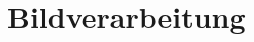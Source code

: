 \section{Bildverarbeitung} %
\label{sec:bildverarbeitung}
\begin{comment}
	Bildverarbeitung: Notwendige Verfahren und Konzepte erläutern.
\end{comment}

\begin{comment}
	YUV und RGB bzw. RGBA
	kCVPixelFormatType_420YpCbCr8BiPlanarVideoRange, kCVPixelFormatType_420YpCbCr8BiPlanarFullRange and kCVPixelFormatType_32BGRA, except on iPhone 3G, where the supported pixel formats are kCVPixelFormatType_422YpCbCr8 and kCVPixelFormatType_32BGRA..(AVCaptureVideoDataOutput Class Reference)

	\subsection{Grundlagen} %
	\label{sec:grundlagen}
	Ein digitales Bild ist definiert durch seine Bildgröße und der Auflösung. Die Bildgröße ist in Höhe und Breite angegeben und eine entsprechende Bildmatrix kann durch die Bildspalten $u$ und Bildzeilen $v$ angegeben werden. Die Auflösung eines Bildes bezeichnet die räumliche Ausdehnung in \gls{dpi}, die in den meisten Bildverarbeitungsschritten vernachlässigt werden kann.

	Um auf ein \gls{pixel} aus der Bildmatrix zugreifen zu können, benötigen wir ein Koordiantensystem. Bei digitalen Bildern unterscheidet sich das verwendete Koordinatensystem von einem kartesischen Koordinatensystem dadurch, dass der Ursprungspunkt bei Bildern links oben liegt. Die \(x\)-Achse verläuft von links nach rechts und die \(y\)-Achse von oben nach unten. TODO: vgl abbildung.

	Die Information eines \gls{pixel} ist als binärer Wert mit der Länge \(k\) gespeichert. Der Wertebereich eines \gls{pixel} umfasst \(\left[0 \dotsc 2^k\right]\), wobei der genaue Wertebereich abhängig vom eingesetzten Typ ist.

	Man unterscheidet im Allgemeinen zwischen Farb-, Monochrome- und Binärbildern, die eine direkte Auswirkung auf den Wertebereich haben. Bei Farbbildern wird häufig eine Komponente für Rot, Grün und Blau verwendet und ist typischerweise in 8 Bits kodiert. Ein Pixel besteht somit aus \(3 \cdot 8 = 24\) Bits mit einem Wertebereich von \(\left[0 \dotsc 255\right]\) pro Farbkomponente.\\TODO: Bild mit Speicherbeschreibung für RGB

	Monochromebilder bestehen nur aus einem Intensitätskanal der ebenfalls mit 8 Bits kodiert wird. Der Wertebereich eines Pixel entspricht \(\left[0 \dotsc 255\right]\).\\TODO: Bild mit Speicherbeschreibung für Monochrome

	Bei Binärbildern werden Informationen nur in einem Bit gespeichert und der Wert entspricht somit \(0\) oder \(1\) für Schwarz oder Weiß.\\TODO: Bild mit Speicherbeschreibung für Binär.
\end{comment}

